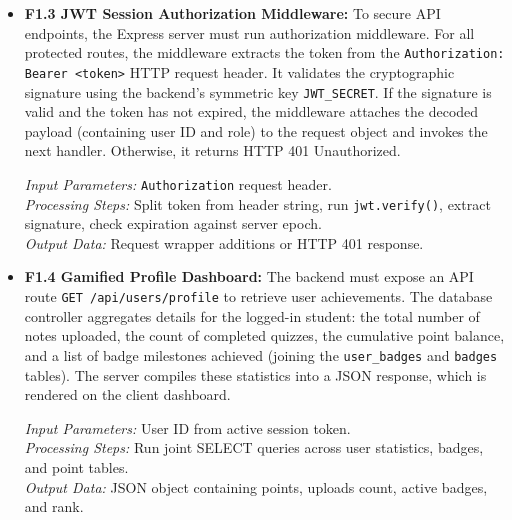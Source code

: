 \documentclass[12,Times new Roman,a4paper]{report}
\begin{document}
\begin{itemize}
    \item \textbf{F1.3 JWT Session Authorization Middleware:} To secure API endpoints, the Express server must run authorization middleware. For all protected routes, the middleware extracts the token from the \texttt{Authorization: Bearer <token>} HTTP request header. It validates the cryptographic signature using the backend's symmetric key \texttt{JWT\_SECRET}. If the signature is valid and the token has not expired, the middleware attaches the decoded payload (containing user ID and role) to the request object and invokes the next handler. Otherwise, it returns HTTP 401 Unauthorized.
    
    \textit{Input Parameters:} \texttt{Authorization} request header. \\
    \textit{Processing Steps:} Split token from header string, run \texttt{jwt.verify()}, extract signature, check expiration against server epoch. \\
    \textit{Output Data:} Request wrapper additions or HTTP 401 response.
    
    \item \textbf{F1.4 Gamified Profile Dashboard:} The backend must expose an API route \texttt{GET /api/users/profile} to retrieve user achievements. The database controller aggregates details for the logged-in student: the total number of notes uploaded, the count of completed quizzes, the cumulative point balance, and a list of badge milestones achieved (joining the \texttt{user\_badges} and \texttt{badges} tables). The server compiles these statistics into a JSON response, which is rendered on the client dashboard.
    
    \textit{Input Parameters:} User ID from active session token. \\
    \textit{Processing Steps:} Run joint SELECT queries across user statistics, badges, and point tables. \\
    \textit{Output Data:} JSON object containing points, uploads count, active badges, and rank.
\end{itemize}
\end{document}
